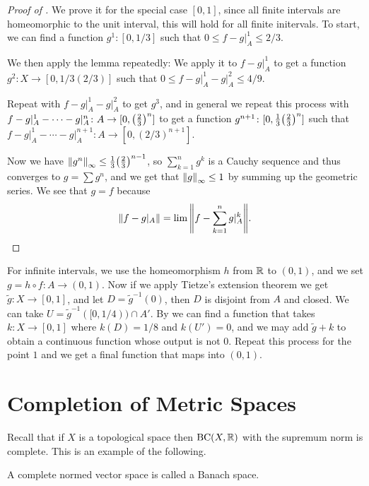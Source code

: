 \begin{proof}[Proof of ]
    We prove it for the special case $[0, 1]$, since all finite intervals are homeomorphic to the unit interval, this will hold for all finite initervals. To start, we can find a function $g^1 \colon [0, 1/3]$ such that $0 \le f - g\vert_A^1 \le 2/3$.

    We then apply the lemma repeatedly: We apply it to $f - g\vert_A^1$ to get a function $g^2\colon X \to [0, 1/3(2/3)]$ such that $0 \le f - g\vert_A^1 - g\vert_A^2 \le 4/9$.

    Repeat with $f - g\vert_A^1 - g\vert_A^2$ to get $g^3$, and in general we repeat this process with $f - g\vert_A^1 - \cdots - g\vert_A^n\colon A \to [0, \qty(\frac 23)^n]$ to get a function $g^{n + 1} \colon [0, \frac{1}{3}\qty(\frac{2}{3})^n]$ such that $f - g\vert_A^1 - \cdots - g\vert_A^{n + 1}\colon A \to [0, (2/3)^{n + 1}]$.

    Now we have $\norm{g^n}_\infty \le \frac{1}{3}\qty(\frac{2}{3})^{n - 1}$, so $\sum_{k = 1}^{n} g^k$ is a Cauchy sequence and thus converges to $g = \sum g^n$, and we get that $\norm{g}_\infty \le 1$ by summing up the geometric series. We see that $g = f$ because \[\norm{f - g\vert_A} = \lim \norm{f - \sum_{k = 1}^n g\vert_A^k}.\]
\end{proof}

For infinite intervals, we use the homeomorphism $h$ from $\mathbb R$ to $(0, 1)$, and we set $g = h \circ f \colon A \to (0, 1)$. Now if we apply Tietze's extension theorem we get $\tilde g \colon X \to [0, 1]$, and let $D = \tilde g^{-1}(0)$, then $D$ is disjoint from $A$ and closed. We can take $U = \tilde g^{-1}([0, 1/4)) \cap A'$. By  we can find a function that takes $k \colon X \to [0, 1]$ where $k(D) = 1/8$ and $k(U') = 0$, and we may add $\tilde g + k$ to obtain a continuous function whose output is not $0$. Repeat this process for the point $1$ and we get a final function that maps into $(0, 1)$.

\section{Completion of Metric Spaces}


Recall that if $X$ is a topological space then $\mathrm{BC}(X, \mathbb R)$ with the supremum norm is complete. This is an example of the following.

\begin{definition}
    A complete normed vector space is called a Banach space.
\end{definition}

